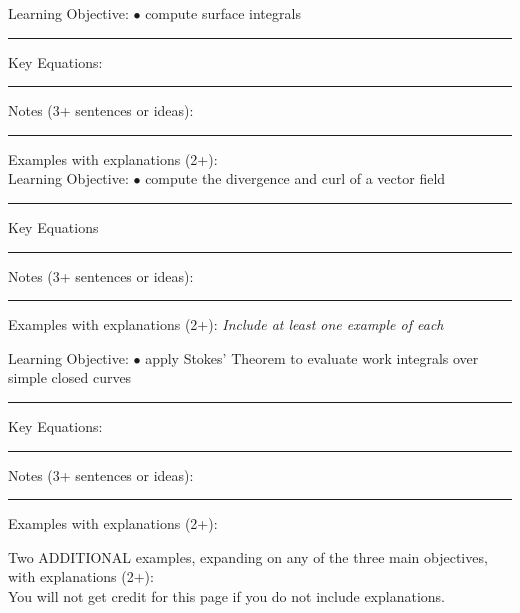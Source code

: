 \documentclass{article}
\theoremstyle{plain}
\theoremstyle{definition}
\theoremstyle{remark}
\begin{document}
\vskip-2pt
\noindent \large Learning Objective:
\normalsize
\vskip0.15in
$\bullet$ compute surface integrals\\
\vskip0.15in
\hrule
\vspace{0.1in}
\large \noindent Key Equations:
\normalsize

\vspace{1in}
\hrule
\vspace{0.1in}
\large \noindent Notes (3+ sentences or ideas):
\normalsize
\vspace{1.75in}
\hrule
\vspace{0.1in}

\large \noindent Examples with explanations (2+):\\


\newpage
\noindent \large Learning Objective:
\normalsize
\vskip0.15in
$\bullet$ compute the divergence and curl of a vector field
\vskip0.15in
\hrule
\vspace{0.1in}
\large \noindent Key Equations\\
\normalsize

\vspace{1in}
\hrule
\vspace{0.1in}
\large \noindent Notes (3+ sentences or ideas):
\normalsize
\vspace{1.75in}
\hrule
\vspace{0.1in}

\large \noindent Examples with explanations (2+):
\emph{Include at least one example of each}

\newpage
\noindent \large Learning Objective:
\normalsize
\vskip0.15in
$\bullet$ apply Stokes' Theorem to evaluate work integrals over simple closed curves
\vskip0.15in
\hrule
\vspace{0.1in}
\large \noindent Key Equations:
\normalsize

\vspace{1in}
\hrule
\vspace{0.1in}
\large \noindent Notes (3+ sentences or ideas):
\normalsize
\vspace{1.75in}
\hrule
\vspace{0.1in}

\large \noindent Examples with explanations (2+):\\
\normalsize

\newpage

\large \noindent Two ADDITIONAL examples, expanding on any of the three main objectives, with explanations (2+):\\
You will not get credit for this page if you do not include explanations.
\end{document}
